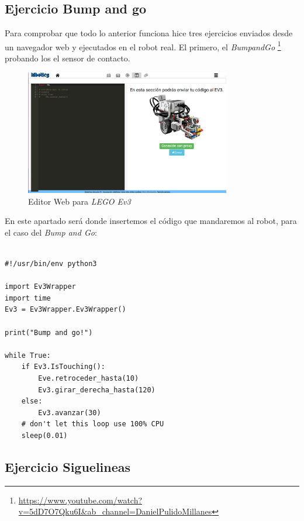 \subsection{Ejercicio Bump and go}
Para comprobar que todo lo anterior funciona hice tres ejercicios enviados desde un navegador web y ejecutados en el robot real. El primero, el \textit{BumpandGo} \footnote{\url{https://www.youtube.com/watch?v=5dD7O7Qku6I&ab_channel=DanielPulidoMillanes}} probando los el sensor de contacto.
\\
\begin{figure}[h!]
  \centering
    \includegraphics[width=0.8\textwidth]{img/editor_ev3.png}
  \caption{Editor Web para \textit{LEGO Ev3}}
  \label{Editor Web}
\end{figure}
\clearpage

En este apartado será donde insertemos el código que mandaremos al robot, para el caso del \textit{Bump and Go}:


\begin{lstlisting}[frame=single,breaklines=true, label=Bump and Go, caption=Bump and Go,  captionpos=b]

#!/usr/bin/env python3

import Ev3Wrapper
import time
Ev3 = Ev3Wrapper.Ev3Wrapper()

print("Bump and go!")

while True:
    if Ev3.IsTouching():
    	Eve.retroceder_hasta(10)
        Ev3.girar_derecha_hasta(120)
    else:
        Ev3.avanzar(30)
    # don't let this loop use 100% CPU
    sleep(0.01)

\end{lstlisting}



\subsection{Ejercicio Siguelineas}


